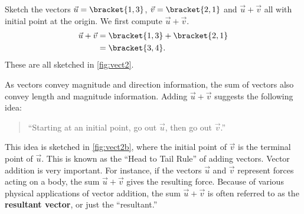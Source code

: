 \begin{example}\label{ex_vect2}
Sketch the vectors $\vec u =\bracket{1,3}$, $\vec v =\bracket{2,1}$ and $\vec u+\vec v$ all with initial point at the origin.
\solution
We first compute $\vec u +\vec v$.
%
%
\begin{align*}
	\vec u+\vec v &=\bracket{1,3}+\bracket{2,1}\\
	&=\bracket{3,4}.
\end{align*}
These are all sketched in \autoref{fig:vect2}.
\end{example}

As vectors convey magnitude and direction information, the sum of vectors also convey length and magnitude information. Adding $\vec u+\vec v$ suggests the following idea:
\begin{quotation}
``Starting at an initial point, go out $\vec u$, then go out $\vec v$.''
\end{quotation}

This idea is sketched in \autoref{fig:vect2b}, where the initial point of $\vec v$ is the terminal point of $\vec u$. This is known as the ``Head to Tail Rule'' of adding vectors. Vector addition is very important. For instance, if the vectors $\vec u$ and $\vec v$ represent forces acting on a body, the sum $\vec u+\vec v$ gives the resulting force. Because of various physical applications of vector addition, the sum $\vec u+\vec v$ is often referred to as the \textbf{resultant vector}, or just the ``resultant.''

